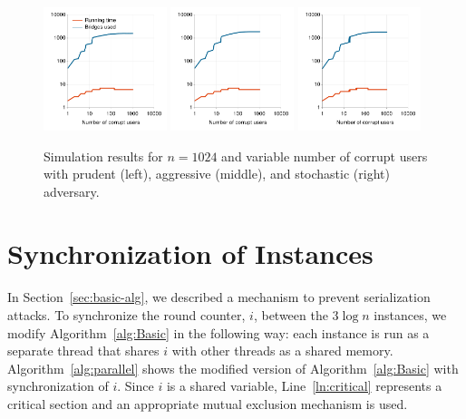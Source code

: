 \documentclass[letterpaper,twocolumn,10pt]{article}
\begin{document}
\begin{figure}
	\hspace{-0.4em}
	\includegraphics[width=0.32\textwidth]{images/plot-prudent-VarT-1024}	
	\hspace{0.3em}
	\includegraphics[width=0.32\textwidth]{images/plot-aggressive-VarT-1024}	
	\hspace{0.3em}
	\includegraphics[width=0.32\textwidth]{images/plot-stochastic-VarT-1024}
	\caption{Simulation results for ${n=1024}$ and variable number of corrupt users with prudent (left), aggressive (middle), and stochastic (right) adversary.}
	\label{fig:plot2} 
\end{figure}

\section{Synchronization of Instances} \label{sec:synci}
In Section~\ref{sec:basic-alg}, we described a mechanism to prevent serialization attacks. To synchronize the round counter, $i$, between the $3\log{n}$ instances, we modify Algorithm~\ref{alg:Basic} in the following way: each instance is run as a separate thread that shares $i$ with other threads as a shared memory. Algorithm~\ref{alg:parallel} shows the modified version of Algorithm~\ref{alg:Basic} with synchronization of $i$. Since $i$ is a shared variable, Line~\ref{ln:critical} represents a critical section and an appropriate mutual exclusion mechanism is used.
\end{document}

